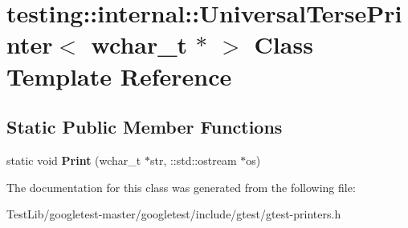 \hypertarget{classtesting_1_1internal_1_1UniversalTersePrinter_3_01wchar__t_01_5_01_4}{}\section{testing\+:\+:internal\+:\+:Universal\+Terse\+Printer$<$ wchar\+\_\+t $\ast$ $>$ Class Template Reference}
\label{classtesting_1_1internal_1_1UniversalTersePrinter_3_01wchar__t_01_5_01_4}
\subsection*{Static Public Member Functions}
\begin{DoxyCompactItemize}
\item 
\mbox{\label{classtesting_1_1internal_1_1UniversalTersePrinter_3_01wchar__t_01_5_01_4_a9cdf673b44d19e6879253f30f11cd740}} 
static void {\bfseries Print} (wchar\+\_\+t $\ast$str, \+::std\+::ostream $\ast$os)
\end{DoxyCompactItemize}


The documentation for this class was generated from the following file\+:\begin{DoxyCompactItemize}
\item 
Test\+Lib/googletest-\/master/googletest/include/gtest/gtest-\/printers.\+h\end{DoxyCompactItemize}
